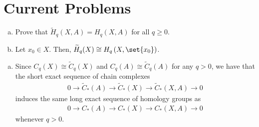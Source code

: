\documentclass[10pt]{mypackage}
\begin{document}
\section{Current Problems}%
\begin{problem}[Problem 1]\hfill
  \begin{enumerate}[(a)]
    \item Prove that $ \widetilde{H}_q\left( X,A \right) = H_q\left( X,A \right) $ for all $q\geq 0$.
    \item Let $x_0\in X$. Then, $\widetilde{H}_q(X)\cong H_q\left( X,\set{x_0} \right)$.
  \end{enumerate}
\end{problem}
\begin{solution}\hfill
  \begin{enumerate}[(a)]
    \item Since $C_q\left( X \right)\cong \widetilde{C}_q\left( X \right)$ and $C_q\left( A \right)\cong \widetilde{C}_q\left( A \right)$ for any $q > 0$, we have that the short exact sequence of chain complexes
      \begin{align*}
        0\rightarrow \widetilde{C}_{\ast}\left( A \right)\rightarrow \widetilde{C}_{\ast}\left( X \right)\rightarrow \widetilde{C}_{\ast}\left( X,A \right)\rightarrow 0
      \end{align*}
      induces the same long exact sequence of homology groups as
      \begin{align*}
        0 \rightarrow C_{\ast}\left( A \right)\rightarrow C_{\ast}\left( X \right)\rightarrow C_{\ast}\left( X,A \right)\rightarrow 0
      \end{align*}
      whenever $q > 0$.


\end{enumerate}
\end{solution}
\end{document}
